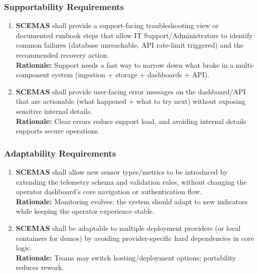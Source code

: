 \documentclass[]{article}
\begin{document}
\subsubsection{Supportability Requirements}
\label{ssub:supportability_requirements}
\begin{enumerate}[{MS-S}1. ]
	\item \textbf{SCEMAS} shall provide a support-facing troubleshooting view or documented runbook steps that allow IT Support/Administrators to identify common failures (database unreachable, API rate-limit triggered) and the recommended recovery action.\\
    \textbf{Rationale:} Support needs a fast way to narrow down what broke in a multi-component system (ingestion + storage + dashboards + API).
    
	\item \textbf{SCEMAS} shall provide user-facing error messages on the dashboard/API that are actionable (what happened + what to try next) without exposing sensitive internal details.\\
    \textbf{Rationale:} Clear errors reduce support load, and avoiding internal details supports secure operations.
\end{enumerate}

\subsubsection{Adaptability Requirements}
\label{ssub:adaptability_requirements}
\begin{enumerate}[{MS-A}1. ]
	\item \textbf{SCEMAS} shall allow new sensor types/metrics to be introduced by extending the telemetry schema and validation rules, without changing the operator dashboard's core navigation or authentication flow.\\
    \textbf{Rationale:} Monitoring evolves; the system should adapt to new indicators while keeping the operator experience stable.
    
	\item \textbf{SCEMAS} shall be adaptable to multiple deployment providers (or local containers for demos) by avoiding provider-specific hard dependencies in core logic.\\
    \textbf{Rationale:} Teams may switch hosting/deployment options; portability reduces rework.
\end{enumerate}
\end{document}
